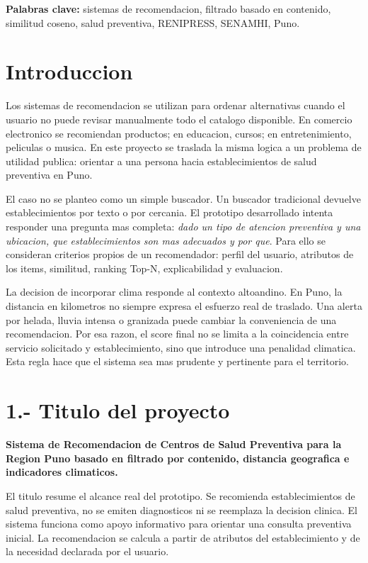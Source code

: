 \documentclass[12pt,a4paper]{article}
\begin{document}
\noindent\textbf{Palabras clave:} sistemas de recomendacion, filtrado basado en contenido, similitud coseno, salud preventiva, RENIPRESS, SENAMHI, Puno.

\newpage
\tableofcontents
\newpage
{}

\section*{Introduccion}
Los sistemas de recomendacion se utilizan para ordenar alternativas cuando el usuario no puede revisar manualmente todo el catalogo disponible. En comercio electronico se recomiendan productos; en educacion, cursos; en entretenimiento, peliculas o musica. En este proyecto se traslada la misma logica a un problema de utilidad publica: orientar a una persona hacia establecimientos de salud preventiva en Puno.

El caso no se planteo como un simple buscador. Un buscador tradicional devuelve establecimientos por texto o por cercania. El prototipo desarrollado intenta responder una pregunta mas completa: \textit{dado un tipo de atencion preventiva y una ubicacion, que establecimientos son mas adecuados y por que}. Para ello se consideran criterios propios de un recomendador: perfil del usuario, atributos de los items, similitud, ranking Top-N, explicabilidad y evaluacion.

La decision de incorporar clima responde al contexto altoandino. En Puno, la distancia en kilometros no siempre expresa el esfuerzo real de traslado. Una alerta por helada, lluvia intensa o granizada puede cambiar la conveniencia de una recomendacion. Por esa razon, el score final no se limita a la coincidencia entre servicio solicitado y establecimiento, sino que introduce una penalidad climatica. Esta regla hace que el sistema sea mas prudente y pertinente para el territorio.

\section{1.- Titulo del proyecto}
\textbf{Sistema de Recomendacion de Centros de Salud Preventiva para la Region Puno basado en filtrado por contenido, distancia geografica e indicadores climaticos.}

El titulo resume el alcance real del prototipo. Se recomienda establecimientos de salud preventiva, no se emiten diagnosticos ni se reemplaza la decision clinica. El sistema funciona como apoyo informativo para orientar una consulta preventiva inicial. La recomendacion se calcula a partir de atributos del establecimiento y de la necesidad declarada por el usuario.
\end{document}
